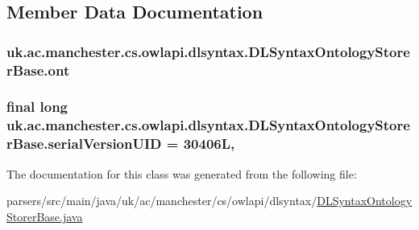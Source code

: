 \subsection{Member Data Documentation}
\hypertarget{classuk_1_1ac_1_1manchester_1_1cs_1_1owlapi_1_1dlsyntax_1_1_d_l_syntax_ontology_storer_base_a8ce3d5f0b4ae32145b43ce3c1220b3ba}{
\subsubsection[{ont}]{ uk.\-ac.\-manchester.\-cs.\-owlapi.\-dlsyntax.\-D\-L\-Syntax\-Ontology\-Storer\-Base.\-ont\hspace{0.3cm}{\ttfamily [private]}}}\label{classuk_1_1ac_1_1manchester_1_1cs_1_1owlapi_1_1dlsyntax_1_1_d_l_syntax_ontology_storer_base_a8ce3d5f0b4ae32145b43ce3c1220b3ba}
\hypertarget{classuk_1_1ac_1_1manchester_1_1cs_1_1owlapi_1_1dlsyntax_1_1_d_l_syntax_ontology_storer_base_a3bdd6a8eaad3ea4a2faa034933dbf4e1}{
\subsubsection[{serial\-Version\-U\-I\-D}]{\setlength{\rightskip}{0pt plus 5cm}final long uk.\-ac.\-manchester.\-cs.\-owlapi.\-dlsyntax.\-D\-L\-Syntax\-Ontology\-Storer\-Base.\-serial\-Version\-U\-I\-D = 30406\-L\hspace{0.3cm}{\ttfamily [static]}, {\ttfamily [private]}}}\label{classuk_1_1ac_1_1manchester_1_1cs_1_1owlapi_1_1dlsyntax_1_1_d_l_syntax_ontology_storer_base_a3bdd6a8eaad3ea4a2faa034933dbf4e1}


The documentation for this class was generated from the following file\-:\begin{DoxyCompactItemize}
\item 
parsers/src/main/java/uk/ac/manchester/cs/owlapi/dlsyntax/\hyperlink{_d_l_syntax_ontology_storer_base_8java}{D\-L\-Syntax\-Ontology\-Storer\-Base.\-java}\end{DoxyCompactItemize}

